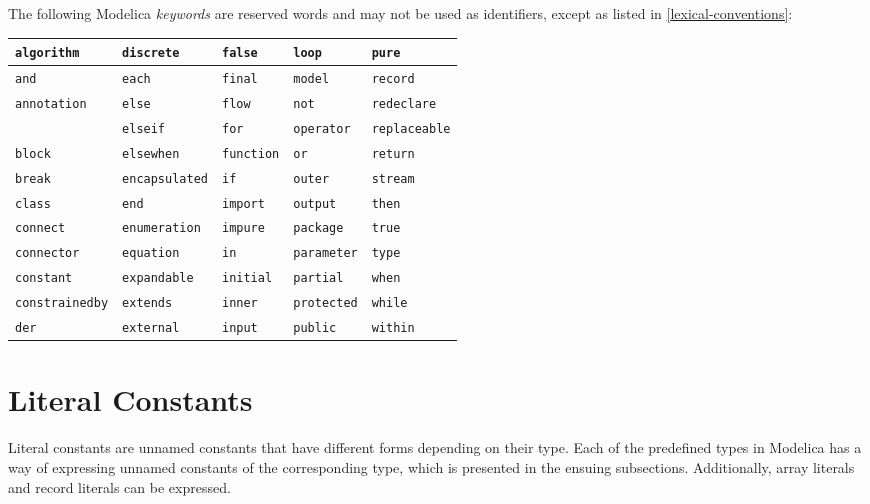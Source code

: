 The following Modelica \emph{keywords} are reserved words and may not be
used as identifiers, except as listed in \autoref{lexical-conventions}:
\begin{longtable}[c]{@{}lllll@{}}
\lstinline!algorithm! & \lstinline!discrete! & \lstinline!false! & \lstinline!loop! & \lstinline!pure!\\ \hline
\lstinline!and! & \lstinline!each! & \lstinline!final! & \lstinline!model! & \lstinline!record!\\ \hline
\lstinline!annotation! & \lstinline!else! & \lstinline!flow! & \lstinline!not! & \lstinline!redeclare!\\ \hline
& \lstinline!elseif! & \lstinline!for! & \lstinline!operator! & \lstinline!replaceable!\\ \hline
\lstinline!block! & \lstinline!elsewhen! & \lstinline!function! & \lstinline!or! & \lstinline!return!\\ \hline
\lstinline!break! & \lstinline!encapsulated! & \lstinline!if! & \lstinline!outer! & \lstinline!stream!\\ \hline
\lstinline!class! & \lstinline!end! & \lstinline!import! & \lstinline!output! & \lstinline!then!\\ \hline
\lstinline!connect! & \lstinline!enumeration! & \lstinline!impure! & \lstinline!package! & \lstinline!true!\\ \hline
\lstinline!connector! & \lstinline!equation! & \lstinline!in! & \lstinline!parameter! & \lstinline!type!\\ \hline
\lstinline!constant! & \lstinline!expandable! & \lstinline!initial! & \lstinline!partial! & \lstinline!when!\\ \hline
\lstinline!constrainedby! & \lstinline!extends! & \lstinline!inner! & \lstinline!protected! & \lstinline!while!\\ \hline
\lstinline!der! & \lstinline!external! & \lstinline!input! & \lstinline!public! & \lstinline!within!\\ \hline
\end{longtable}

\section{Literal Constants}

Literal constants are unnamed constants that have different forms
depending on their type. Each of the predefined types in Modelica has a
way of expressing unnamed constants of the corresponding type, which is
presented in the ensuing subsections. Additionally, array literals and
record literals can be expressed.

